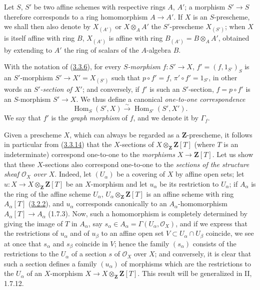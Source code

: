 \begin{env}[3.3.13]
\label{I.3.3.13}
Let $S$, $S'$ be two affine schemes with respective rings $A$, $A'$; a
morphism $S'\to S$ therefore corresponds to a ring homomorphism $A\to A'$.
If $X$ is an $S$-prescheme, we shall then also denote by $X_{(A')}$ or
$X\otimes_A A'$ the $S'$-prescheme $X_{(S')}$; when $X$ is itself
affine with ring $B$, $X_{(A')}$ is affine with ring
$B_{(A')}=B\otimes_A A'$, obtained by extending to $A'$ the ring of scalars
of the $A$-algebra $B$.
\end{env}

\begin{env}[3.3.14]
\label{I.3.3.14}
With the notation of (\hyperref[I.3.3.6]{3.3.6}), for every
\emph{$S$-morphism} $f:S'\to X$, $f'=(f,1_{S'})_S$ is an $S'$-morphism
$S'\to X'=X_{(S')}$ such that $p\circ f'=f$, $\pi'\circ f'=1_{S'}$, in other
words an \emph{$S'$-section of $X'$}; and conversely, if $f'$ is such an
$S'$-section, $f=p\circ f'$ is an $S$-morphism $S'\to X$. We thus define
a canonical \emph{one-to-one correspondence}
\label{I.3.3.14.correspondence}
\[
  \operatorname{Hom}_S(S',X)\overset{\sim}{\longrightarrow}
  \operatorname{Hom}_{S'}(S',X').
\]
We say that $f'$ is the \emph{graph morphism} of $f$, and we denote it by
$\Gamma_f$.
\end{env}

\begin{env}[3.3.15]
\label{I.3.3.15}
Given a prescheme $X$, which can always be regarded as a
$\mathbf{Z}$-prescheme, it follows in particular from
(\hyperref[I.3.3.14]{3.3.14}) that the $X$-sections of
$X\otimes_{\mathbf{Z}}\mathbf{Z}[T]$ (where $T$ is an indeterminate)
correspond one-to-one to the \emph{morphisms}
$X\to\mathbf{Z}[T]$. Let us show that these $X$-sections also correspond
one-to-one to the \emph{sections of the structure sheaf
$\mathcal{O}_X$ over $X$}. Indeed, let $(U_\alpha)$ be a covering
of $X$ by affine open sets; let
$u:X\to X\otimes_{\mathbf{Z}}\mathbf{Z}[T]$ be an $X$-morphism and let
$u_\alpha$ be its restriction to $U_\alpha$; if $A_\alpha$ is the ring of the
affine scheme $U_\alpha$, $U_\alpha\otimes_{\mathbf{Z}}\mathbf{Z}[T]$ is an
affine scheme with ring $A_\alpha[T]$ (\hyperref[I.3.2.2]{3.2.2}), and
$u_\alpha$ corresponds canonically to an $A_\alpha$-homomorphism
$A_\alpha[T]\to A_\alpha$ (1.7.3). Now, such a homomorphism is completely
determined by giving the image of $T$ in $A_\alpha$, say
$s_\alpha\in A_\alpha=\Gamma(U_\alpha,\mathcal{O}_X)$, and if we express that
the restrictions of $u_\alpha$ and of $u_\beta$ to an affine open set
$V\subset U_\alpha\cap U_\beta$ coincide, we see at once that $s_\alpha$
and $s_\beta$ coincide in $V$; hence the family $(s_\alpha)$ consists of the
restrictions to the $U_\alpha$ of a section $s$ of $\mathcal{O}_X$ over
$X$; and conversely, it is clear that such a section defines a family
$(u_\alpha)$ of morphisms which are the restrictions to the $U_\alpha$ of an
$X$-morphism $X\to X\otimes_{\mathbf{Z}}\mathbf{Z}[T]$. This result will be
generalized in II, 1.7.12.
\end{env}

